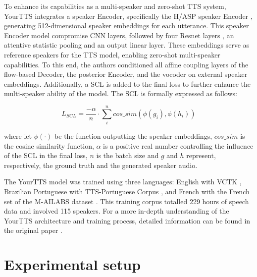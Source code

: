 To enhance its capabilities as a multi-speaker and zero-shot \ac{TTS} system, YourTTS integrates a speaker Encoder, specifically the \ac{H/ASP} speaker Encoder \cite{heo2020clova}, generating 512-dimensional speaker embeddings for each utterance. This speaker Encoder model compromise \ac{CNN} layers, followed by four Resnet layers \cite{targ2016resnet}, an attentive statistic pooling and an output linear layer. These embeddings serve as reference speakers for the \ac{TTS} model, enabling zero-shot multi-speaker capabilities. To this end, the authors conditioned all affine coupling layers of the flow-based Decoder, the posterior Encoder, and the vocoder on external speaker embeddings. Additionally, a \ac{SCL} is added to the final loss to further enhance the multi-speaker ability of the model. The \ac{SCL} is formally expressed as follows:

\begin{equation}
    L_{SCL} = \frac{-\alpha}{n} \cdot \sum_{i}^{n} cos\_sim(\phi(g_i), \phi(h_i))
\end{equation}

where let $\phi(\cdot)$ be the function outputting the speaker embeddings, $cos\_sim$ is the cosine similarity function, $\alpha$ is a positive real number controlling the influence of the \ac{SCL} in the final loss, $n$ is the batch size and $g$ and $h$ represent, respectively, the ground truth and the generated speaker audio.

The YourTTS model was trained using three languages: English with VCTK \cite{veaux2016superseded}, Brazilian Portuguese with TTS-Portuguese Corpus \cite{casanova2022tts}, and French with the French set of the M-AILABS dataset \cite{mailabs}. This training corpus totalled 229 hours of speech data and involved 115 speakers. For a more in-depth understanding of the YourTTS architecture and training process, detailed information can be found in the original paper \cite{casanova2022yourtts}.


\section{Experimental setup}
\label{section:methods}


